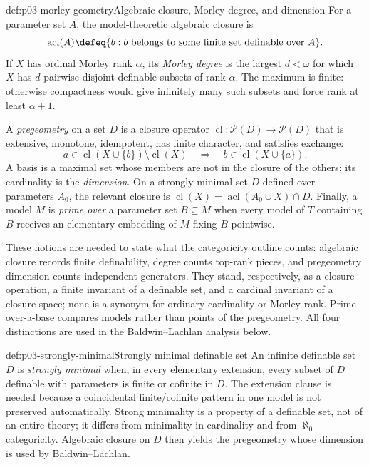 \begin{hbdefinition}{def:p03-morley-geometry}{Algebraic closure, Morley degree, and dimension}
For a parameter set \(A\), the model-theoretic algebraic closure is
\[
 \operatorname{acl}(A)
 \defeq\{b:b\text{ belongs to some finite set definable over }A\}.
\]
If \(X\) has ordinal Morley rank \(\alpha\), its \emph{Morley degree} is the
largest \(d<\omega\) for which \(X\) has \(d\) pairwise disjoint definable
subsets of rank \(\alpha\).  The maximum is finite: otherwise compactness
would give infinitely many such subsets and force rank at least
\(\alpha+1\).

A \emph{pregeometry} on a set \(D\) is a closure operator
\(\operatorname{cl}:\mathcal P(D)\to\mathcal P(D)\) that is extensive,
monotone, idempotent, has finite character, and satisfies exchange:
\[
 a\in\operatorname{cl}(X\cup\{b\})\setminus\operatorname{cl}(X)
 \quad\Longrightarrow\quad
 b\in\operatorname{cl}(X\cup\{a\}).
\]
A basis is a maximal set whose members are not in the closure of the others;
its cardinality is the \emph{dimension}.  On a strongly minimal set \(D\)
defined over parameters \(A_0\), the relevant closure is
\(\operatorname{cl}(X)=\operatorname{acl}(A_0\cup X)\cap D\).
Finally, a model \(M\) is \emph{prime over} a parameter set \(B\subseteq M\)
when every model of \(T\) containing \(B\) receives an elementary embedding
of \(M\) fixing \(B\) pointwise.

These notions are needed to state what the categoricity outline counts:
algebraic closure records finite definability, degree counts top-rank pieces,
and pregeometry dimension counts independent generators.  They stand,
respectively, as a closure operation, a finite invariant of a definable set,
and a cardinal invariant of a closure space; none is a synonym for ordinary
cardinality or Morley rank.  Prime-over-a-base compares models rather than
points of the pregeometry.  All four distinctions are used in the
Baldwin--Lachlan analysis below.
\end{hbdefinition}

\begin{hbdefinition}{def:p03-strongly-minimal}{Strongly minimal definable set}
An infinite definable set \(D\) is \emph{strongly minimal} when, in every
elementary extension, every subset of \(D\) definable with parameters is
finite or cofinite in \(D\).  The extension clause is needed because a
coincidental finite/cofinite pattern in one model is not preserved
automatically.  Strong minimality is a property of a definable set, not of an
entire theory; it differs from minimality in cardinality and from
\(\aleph_0\)-categoricity.  Algebraic closure on \(D\) then yields the
pregeometry whose dimension is used by Baldwin--Lachlan.
\end{hbdefinition}

